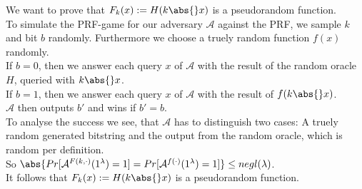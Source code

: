 We want to prove that \(F_k(x) := H (k \abs{} x)\) is a pseudorandom function.\\
To simulate the PRF-game for our adversary \(\mathcal{A}\) against the PRF, we sample \(k\) and bit \(b\) randomly. Furthermore we choose a truely random function \(f(x)\) randomly. \\
If \(b= 0\), then we answer each query \(x\) of \(\mathcal{A}\) with the result of the random oracle \(H\), queried with \(k \abs{} x\).\\
If \(b= 1\), then we answer each query \(x\) of \(\mathcal{A}\) with the result of \(f(k \abs{} x)\).\\
\(\mathcal{A}\) then outputs \(b'\) and wins if \(b' = b\).\\
To analyse the success we see, that \(\mathcal{A}\) has to distinguish two cases: A truely random generated bitstring and the output from the random oracle, which is random per definition. \\
So \(\abs{Pr[\mathcal{A}^{F(k,\cdot)}(1^{\lambda})= 1]= Pr[\mathcal{A}^{f(\cdot)}(1^{\lambda})= 1]} \le negl(\lambda)\).\\
It follows that \(F_k(x) := H (k \abs{} x)\) is a pseudorandom function.



 